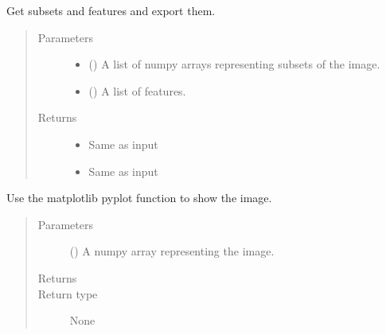 \documentclass[letterpaper,10pt,english]{sphinxmanual}
\begin{document}
\begin{fulllineitems}
\label{\detokenize{api:readpyne.io.save_stack}}
Get subsets and features and export them.
\begin{quote}\begin{description}
\item[{Parameters}] \leavevmode\begin{itemize}
\item {} 
 () \textendash{} A list of numpy arrays representing subsets of the image.

\item {} 
 () \textendash{} A list of features.

\end{itemize}

\item[{Returns}] \leavevmode
\begin{itemize}
\item {} 
 \textendash{} Same as input

\item {} 
 \textendash{} Same as input

\end{itemize}


\end{description}\end{quote}

\end{fulllineitems}


\begin{fulllineitems}
\label{\detokenize{api:readpyne.io.show}}
Use the matplotlib pyplot function to show the image.
\begin{quote}\begin{description}
\item[{Parameters}] \leavevmode
{} () \textendash{} A numpy array representing the image.

\item[{Returns}] \leavevmode


\item[{Return type}] \leavevmode
None

\end{description}\end{quote}

\end{fulllineitems}
\end{document}
